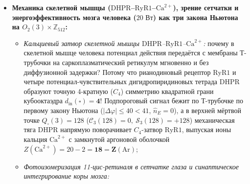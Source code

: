 \begin{itemize}[noitemsep,leftmargin=*]
  \begin{itemize}[noitemsep]
  \item Четырёхканальный субпороговый томограф $(I_4 + N_{\mathrm{nil}})^{-1} = I_4 - N_{\mathrm{nil}} + N_{\mathrm{nil}}^2$ бесконтактно ($\hat{n}_E = 0$) считывает истинный кортикальный отпечаток личности $s_3 = \sigma_{\mathrm{id}}$ и дисфорическое рассогласование $s_1$ задолго до того, как пубертат поведёт тело по чужой для личности ветви.
  \item При этом сама кортикальная личность $\sigma_{\mathrm{id}}$ \textbf{неприкосновенна} (переделывать мозг под оболочку запрещено законом согласия!), а в камере стазиса и редифференцировки по добровольному намерению человека ($s_2 > 0$) эпигенетический профиль \texttt{CpG} и морфогенетические замки соматических тканей мягко и органически выравнивают само тело под истинную идентичность личности ($\sigma_{\mathrm{soma}}\mapsto\sigma_{\mathrm{id}}$, а при откате в Режим~II ребёнок с первой же секунды нового детства растёт сразу в своём родном фенотипе $\sigma_{\mathrm{id}}$) --- \textbf{обнуляя дисфорию ($\Phi_{\mathrm{stress}} = 0$) без единого хирургического разреза и шрама}!
  \end{itemize}
\item \textbf{Механика скелетной мышцы ($\mathrm{DHPR}$--$\mathrm{RyR1}$--$\mathrm{Ca}^{2+}$), зрение сетчатки и энергоэффективность мозга человека ($20\text{ Вт}$) как три закона Ньютона на $O_2(3)\times\mathbb{Z}_{512}$:}
  \begin{itemize}[noitemsep]
  \item \emph{Кальциевый затвор скелетной мышцы $\mathrm{DHPR}$--$\mathrm{RyR1}$--$\mathrm{Ca}^{2+}$:}
    почему в скелетной мышце человека потенциал действия передаётся с мембраны Т-трубочки на саркоплазматический ретикулум мгновенно и без диффузионной задержки? Потому что рианодиновый рецептор $\mathrm{RyR1}$ и четыре потенциал-чувствительных дигидропиридиновых тетрада $\mathrm{DHPR}$ образуют точную 4-кратную ($C_4$) симметрию квадратной грани кубооктаэдра $d_{\mathrm{in}}(\square) = \mathbf{4}$! Подпороговый сигнал бежит по Т-трубочке по первому закону Ньютона ($|\Delta\varphi|\le 40 < 41$, $\hat{n}_E = 0$), а в верхней мёртвой точке $Q_\square(3) = 128$ ($\mathcal{C}_3(128)=0,\ \mathcal{S}_3(128)=+128$) механическая тяга $\mathrm{DHPR}$ напрямую поворачивает $C_4$-затвор $\mathrm{RyR1}$, выпуская ионы кальция $\mathrm{Ca}^{2+}$ с замкнутой аргоновой оболочкой $Z(\mathrm{Ca}^{2+}) = 20 - 2 = \mathbf{18 = Z(\mathrm{Ar})}$;
  \item \emph{Фотоизомеризация 11-цис-ретиналя в сетчатке глаза и синаптическое интегрирование коры мозга:}

\end{itemize}
\end{itemize}
